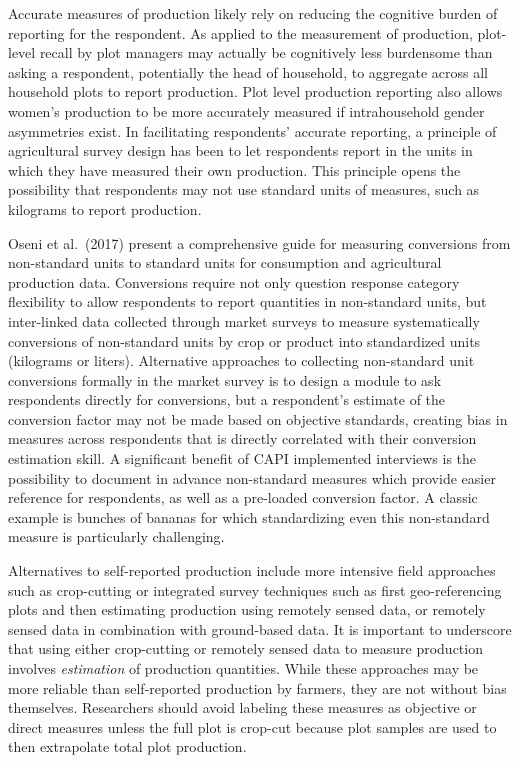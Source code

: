 \documentclass[
]{book}
\begin{document}
Accurate measures of production likely rely on reducing the cognitive burden of reporting for the respondent. As applied to the measurement of production, plot-level recall by plot managers may actually be cognitively less burdensome than asking a respondent, potentially the head of household, to aggregate across all household plots to report production. Plot level production reporting also allows women's production to be more accurately measured if intrahousehold gender asymmetries exist. In facilitating respondents' accurate reporting, a principle of agricultural survey design has been to let respondents report in the units in which they have measured their own production. This principle opens the possibility that respondents may not use standard units of measures, such as kilograms to report production.

Oseni et al.~(2017) present a comprehensive guide for measuring conversions from non-standard units to standard units for consumption and agricultural production data. Conversions require not only question response category flexibility to allow respondents to report quantities in non-standard units, but inter-linked data collected through market surveys to measure systematically conversions of non-standard units by crop or product into standardized units (kilograms or liters). Alternative approaches to collecting non-standard unit conversions formally in the market survey is to design a module to ask respondents directly for conversions, but a respondent's estimate of the conversion factor may not be made based on objective standards, creating bias in measures across respondents that is directly correlated with their conversion estimation skill. A significant benefit of CAPI implemented interviews is the possibility to document in advance non-standard measures which provide easier reference for respondents, as well as a pre-loaded conversion factor. A classic example is bunches of bananas for which standardizing even this non-standard measure is particularly challenging.

Alternatives to self-reported production include more intensive field approaches such as crop-cutting or integrated survey techniques such as first geo-referencing plots and then estimating production using remotely sensed data, or remotely sensed data in combination with ground-based data. It is important to underscore that using either crop-cutting or remotely sensed data to measure production involves \emph{estimation} of production quantities. While these approaches may be more reliable than self-reported production by farmers, they are not without bias themselves. Researchers should avoid labeling these measures as objective or direct measures unless the full plot is crop-cut because plot samples are used to then extrapolate total plot production.
\end{document}
